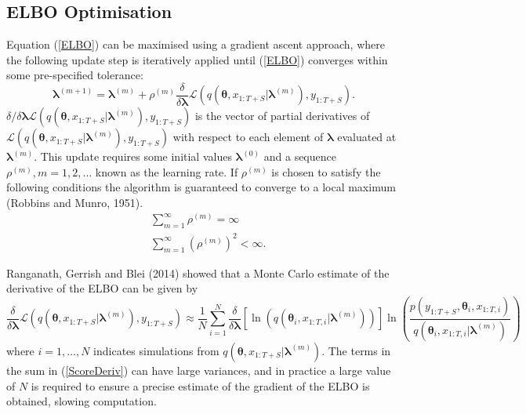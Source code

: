 \documentclass[12pt,a4paper]{article}%
\numberwithin{equation}{section}
\begin{document}
{{\subsection{ELBO Optimisation}
Equation (\ref{ELBO}) can be maximised using a gradient ascent approach, where the following update step is iteratively applied until (\ref{ELBO}) converges within some pre-specified tolerance:
\begin{equation}
\label{GradAscent}
\boldsymbol{\lambda}^{(m+1)} = \boldsymbol{\lambda}^{(m)} + \rho^{(m)} \frac{\delta}{\delta\boldsymbol{\lambda}} \mathcal{L}(q(\boldsymbol{\theta}, x_{1:T+S} | \boldsymbol{\lambda}^{(m)}), y_{1:T+S}).
\end{equation}
$\delta/\delta\boldsymbol{\lambda}\mathcal{L}(q(\boldsymbol{\theta}, x_{1:T+S} | \boldsymbol{\lambda}^{(m)}), y_{1:T+S})$ is the vector of partial derivatives of $\mathcal{L}(q(\boldsymbol{\theta}, x_{1:T+S} | \boldsymbol{\lambda}^{(m)}), y_{1:T+S})$ with respect to each element of $\boldsymbol{\lambda}$ evaluated at $\boldsymbol{\lambda}^{(m)}$. This update requires some initial values $\boldsymbol{\lambda}^{(0)}$ and a sequence $\rho^{(m)}, m = 1, 2, \dots$ known as the learning rate. If $\rho^{(m)}$ is chosen to satisfy the following conditions the algorithm is guaranteed to converge to a local maximum (Robbins and Munro, 1951).
\begin{align}
&\sum_{m=1}^{\infty} \rho^{(m)} =  \infty \\
&\sum_{m=1}^{\infty} (\rho^{(m)})^2 <  \infty.
\end{align}

Ranganath, Gerrish and Blei (2014) showed that a Monte Carlo estimate of the derivative of the ELBO can be given by
\begin{equation}
\label{ScoreDeriv}
\frac{\delta}{\delta\boldsymbol{\lambda}}\mathcal{L}(q(\boldsymbol{\theta}, x_{1:T+S} | \boldsymbol{\lambda}^{(m)}), y_{1:T+S}) \approx \frac{1}{N}\sum_{i=1}^{N} \frac{\delta}{\delta\boldsymbol{\lambda}} [\ln(q(\boldsymbol{\theta}_i, x_{1:T, i} | \boldsymbol{\lambda}^{(m)}))] \ln \left(\frac{p(y_{1:T+S}, \boldsymbol{\theta}_i, x_{1:T, i})}{q(\boldsymbol{\theta}_i, x_{1:T, i} | \boldsymbol{\lambda}^{(m)})} \right) 
\end{equation}
where $i = 1, \dots, N$ indicates simulations from $q(\boldsymbol{\theta}, x_{1:T+S} | \boldsymbol{\lambda}^{(m)})$. 
The terms in the sum in (\ref{ScoreDeriv}) can have large variances, and in practice a large value of $N$ is required to ensure a precise estimate of the gradient of the ELBO is obtained, slowing computation. 

}}
\end{document}
